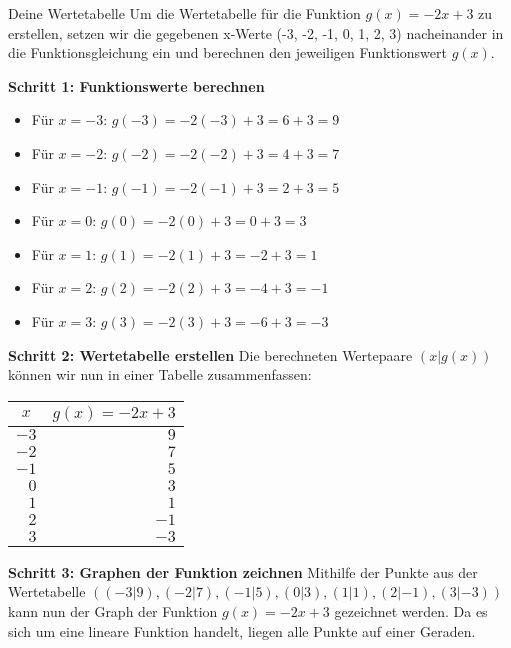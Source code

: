 \begin{loesungsumgebung}{Deine Wertetabelle}
Um die Wertetabelle für die Funktion $g(x) = -2x + 3$ zu erstellen, setzen wir die gegebenen x-Werte (-3, -2, -1, 0, 1, 2, 3) nacheinander in die Funktionsgleichung ein und berechnen den jeweiligen Funktionswert $g(x)$.

\textbf{Schritt 1: Funktionswerte berechnen}
\begin{itemize}
    \item Für $x = -3$: $g(-3) = -2(-3) + 3 = 6 + 3 = 9$
    \item Für $x = -2$: $g(-2) = -2(-2) + 3 = 4 + 3 = 7$
    \item Für $x = -1$: $g(-1) = -2(-1) + 3 = 2 + 3 = 5$
    \item Für $x = 0$: $g(0) = -2(0) + 3 = 0 + 3 = 3$
    \item Für $x = 1$: $g(1) = -2(1) + 3 = -2 + 3 = 1$
    \item Für $x = 2$: $g(2) = -2(2) + 3 = -4 + 3 = -1$
    \item Für $x = 3$: $g(3) = -2(3) + 3 = -6 + 3 = -3$
\end{itemize}

\textbf{Schritt 2: Wertetabelle erstellen}
Die berechneten Wertepaare $(x | g(x))$ können wir nun in einer Tabelle zusammenfassen:

\begin{center}
\begin{tabular}{r r}
\toprule
\multicolumn{1}{c}{$x$} & \multicolumn{1}{c}{$g(x) = -2x + 3$} \\
\midrule
$-3$ & $9$ \\
$-2$ & $7$ \\
$-1$ & $5$ \\
$0$ & $3$ \\
$1$ & $1$ \\
$2$ & $-1$ \\
$3$ & $-3$ \\
\bottomrule
\end{tabular}
\end{center}

\textbf{Schritt 3: Graphen der Funktion zeichnen}
Mithilfe der Punkte aus der Wertetabelle $( (-3|9), (-2|7), (-1|5), (0|3), (1|1), (2|-1), (3|-3) )$ kann nun der Graph der Funktion $g(x) = -2x+3$ gezeichnet werden. Da es sich um eine lineare Funktion handelt, liegen alle Punkte auf einer Geraden.


\end{loesungsumgebung}
